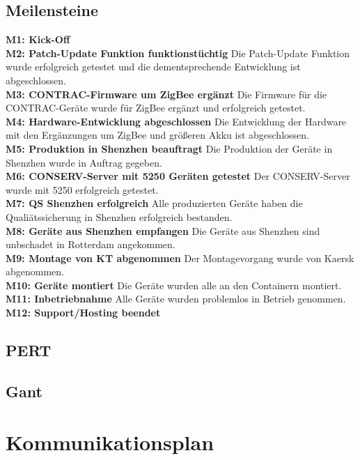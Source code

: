 \subsection{Meilensteine}

\textbf{M1: Kick-Off}\\
\textbf{M2: Patch-Update Funktion funktionstüchtig} Die Patch-Update Funktion wurde erfolgreich getestet und die dementsprechende Entwicklung ist abgeschlossen.\\
\textbf{M3: CONTRAC-Firmware um ZigBee ergänzt} Die Firmware für die CONTRAC-Geräte wurde für ZigBee ergänzt und erfolgreich getestet.\\
\textbf{M4: Hardware-Entwicklung abgeschlossen} Die Entwicklung der Hardware mit den Ergänzungen um ZigBee und größeren Akku ist abgeschlossen.\\
\textbf{M5: Produktion in Shenzhen beauftragt} Die Produktion der Geräte in Shenzhen wurde in Auftrag gegeben.\\
\textbf{M6: CONSERV-Server mit 5250 Geräten getestet} Der CONSERV-Server wurde mit 5250 erfolgreich getestet.\\
\textbf{M7: QS Shenzhen erfolgreich} Alle produzierten Geräte haben die Qualiätssicherung in Shenzhen erfolgreich bestanden.\\
\textbf{M8: Geräte aus Shenzhen empfangen} Die Geräte aus Shenzhen sind unbschadet in Rotterdam angekommen.\\
\textbf{M9: Montage von KT abgenommen} Der Montagevorgang wurde von Kaersk abgenommen.\\
\textbf{M10: Geräte montiert} Die Geräte wurden alle an den Containern montiert.\\
\textbf{M11: Inbetriebnahme} Alle Geräte wurden problemlos in Betrieb genommen.\\
\textbf{M12: Support/Hosting beendet}

\subsection{PERT} %

\subsection{Gant} %

\section{Kommunikationsplan}
